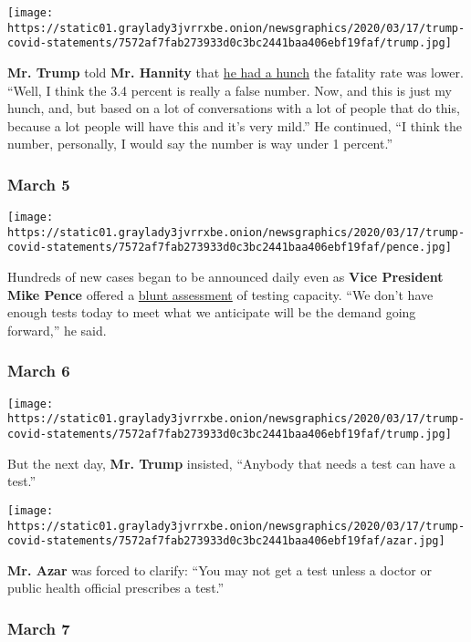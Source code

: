 \texttt{[image: https://static01.graylady3jvrrxbe.onion/newsgraphics/2020/03/17/trump-covid-statements/7572af7fab273933d0c3bc2441baa406ebf19faf/trump.jpg]}

\textbf{Mr. Trump} told \textbf{Mr. Hannity} that
\href{https://www.youtube.com/watch?v=fqjrlKfW93I}{he had a hunch} the
fatality rate was lower. ``Well, I think the 3.4 percent is really a
false number. Now, and this is just my hunch, and, but based on a lot of
conversations with a lot of people that do this, because a lot people
will have this and it's very mild.'' He continued, ``I think the number,
personally, I would say the number is way under 1 percent.''

\hypertarget{march-5}{%
\subsubsection{March 5}\label{march-5}}

\texttt{[image: https://static01.graylady3jvrrxbe.onion/newsgraphics/2020/03/17/trump-covid-statements/7572af7fab273933d0c3bc2441baa406ebf19faf/pence.jpg]}

Hundreds of new cases began to be announced daily even as \textbf{Vice
President Mike Pence} offered a
\href{https://www.nytimes3xbfgragh.onion/2020/03/06/us/politics/pence-trump-coronavirus.html}{blunt
assessment} of testing capacity. ``We don't have enough tests today to
meet what we anticipate will be the demand going forward,'' he said.

\hypertarget{march-6}{%
\subsubsection{March 6}\label{march-6}}

\texttt{[image: https://static01.graylady3jvrrxbe.onion/newsgraphics/2020/03/17/trump-covid-statements/7572af7fab273933d0c3bc2441baa406ebf19faf/trump.jpg]}

But the next day, \textbf{Mr. Trump} insisted, ``Anybody that needs a
test can have a test.''

\texttt{[image: https://static01.graylady3jvrrxbe.onion/newsgraphics/2020/03/17/trump-covid-statements/7572af7fab273933d0c3bc2441baa406ebf19faf/azar.jpg]}

\textbf{Mr. Azar} was forced to clarify: ``You may not get a test unless
a doctor or public health official prescribes a test.''

\hypertarget{march-7}{%
\subsubsection{March 7}\label{march-7}}

